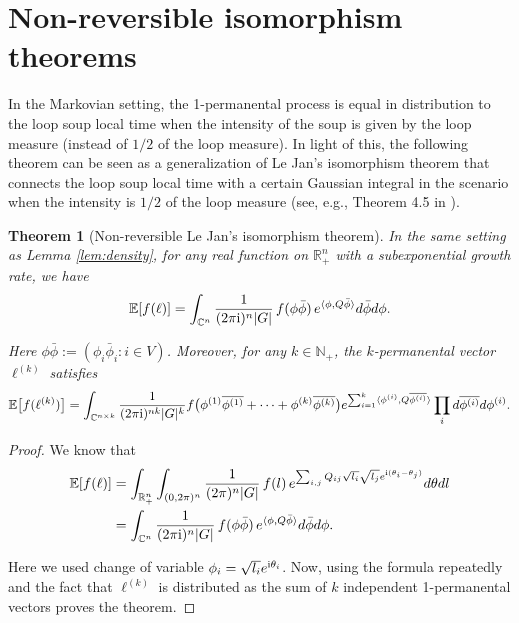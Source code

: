 \documentclass[a4paper, 11pt]{article}
\newcommand{\E}{\mathbb{E}}
\newcommand{\compi}{\textnormal{i}}
\newtheorem{thm}{Theorem}[section]
\begin{document}
\section{Non-reversible isomorphism theorems}

In the Markovian setting, the 1-permanental process is equal in distribution to the loop soup local time when the intensity of the soup is given by the loop measure (instead of $1/2$ of the loop measure). In light of this, the following theorem can be seen as a generalization of Le Jan's isomorphism theorem that connects the loop soup local time with a certain Gaussian integral in the scenario when the intensity
is $1/2$ of the loop measure (see, e.g., Theorem 4.5 in \cite{sznitman12}).

\vspace{.3em} \begin{thm}[Non-reversible Le Jan's isomorphism theorem]
\label{thm:lejan}
In the same setting as Lemma \ref{lem:density}, for any real function on $\mathbb{R}_+^n$ with a subexponential growth rate, we have
\begin{equation}
\E[f(\ell)] = \int_{\mathbb{C}^n} \frac{1}{(2\pi\compi)^n|G|}\,f(\phi\bar{\phi})\, e^{\langle \phi, Q\bar{\phi}\rangle} d\bar{\phi} d\phi.
\label{eqn:lejannr}
\end{equation}

Here $\phi\bar{\phi}:=(\phi_i\bar{\phi}_i: i\in V)$. Moreover, for any $k\in\mathbb{N}_+$, the $k$-permanental vector $\ell^{(k)}$ satisfies
\[\E\big[f(\ell^{(k)})\big]=\int_{\mathbb{C}^{n\times k}}\frac{1}{(2\pi\compi)^{nk}|G|^k}f\big(\phi^{(1)}\overline{\phi^{(1)}}+\cdots+\phi^{(k)}\overline{\phi^{(k)}}\big)e^{\sum_{i=1}^k\langle \phi^{(i)}, Q\overline{\phi^{(i)}}\rangle} \prod_i d\overline{\phi^{(i)}} d\phi^{(i)}.\]
\end{thm}

\begin{proof}
We know that
\begin{equation*}
\begin{aligned}
\E[f(\ell)]
&= \int_{\mathbb{R}_+^n} \int_{(0,2\pi)^n}\frac{1}{(2\pi)^n|G|}\, f(l)\, e^{\sum_{i,j} Q_{ij}\sqrt{l_i}\sqrt{l_j}e^{\compi (\theta_i-\theta_j)}}d\theta dl \\
&= \int_{\mathbb{C}^n} \frac{1}{(2\pi\compi)^n|G|}\, f(\phi\bar{\phi})\, e^{\langle \phi, Q\bar{\phi}\rangle} d\bar{\phi} d\phi . \\
\end{aligned}
\end{equation*}

Here we used change of variable $\phi_i=\sqrt{l_i}e^{\compi \theta_i}$. Now, using the formula repeatedly and the fact that $\ell^{(k)}$ is distributed as the sum of $k$ independent 1-permanental vectors proves the theorem.
\end{proof}
\end{document}
